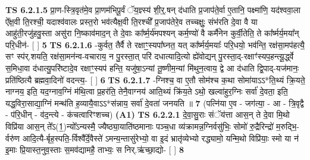 \documentclass[17pt]{extarticle}
\begin{document}
                  \newline
                                \textbf{ TS 6.2.1.5} \newline
                  प्रा॒ण-स्त्रि॒वृत॑मे॒व प्रा॒णम॑भिपू॒र्वं ॅय॒ज्ञ्स्य॑ शी॒र्॒.षन् द॑धाति प्र॒जाप॑ते॒र्वा ए॒तानि॒ पक्ष्मा॑णि॒ यद॑श्ववा॒ला ऐ᳚क्ष॒वी ति॒रश्ची॒ यदाश्व॑वालः प्रस्त॒रो भव॑त्यैक्ष॒वी ति॒रश्ची᳚ प्र॒जाप॑तेरे॒व तच्चक्षुः॒ संभ॑रति दे॒वा वै या आहु॑ती॒रजु॑हवु॒स्ता असु॑रा नि॒ष्काव॑माद॒न् ते दे॒वाः का᳚र्ष्म॒र्य॑मपश्यन् कर्म॒ण्यो॑ वै कर्मै॑नेन कुर्वी॒तेति॒ ते का᳚र्ष्मर्य॒मया᳚न् परि॒धीन॑- [  ] \textbf{  5} \newline
                  \newline
                                \textbf{ TS 6.2.1.6} \newline
                  -कुर्वत॒ तैर्वै ते रक्षाꣳ॒॒स्यपा᳚घ्नत॒ यत् का᳚र्ष्मर्य॒मयाः᳚ परि॒धयो॒ भव॑न्ति॒ रक्ष॑सा॒मप॑हत्यै॒ सꣳ स्प॑र्.शयति॒ रक्ष॑सा॒मन॑न्व-वचाराय॒ न पु॒रस्ता॒त् परि॑ दधात्यादि॒त्यो ह्ये॑वोद्यन् पु॒रस्ता॒द्-रक्षाꣳ॑स्यप॒हन्त्यू॒र्द्ध्वे स॒मिधा॒वा द॑धात्यु॒परि॑ष्टादे॒व रक्षाꣳ॒॒स्यप॑ हन्ति॒ यजु॑षा॒ऽन्यां तू॒ष्णीम॒न्यां मि॑थुन॒त्वाय॒ द्वे आ द॑धाति द्वि॒पाद्-यज॑मानः॒ प्रति॑ष्ठित्यै ब्रह्मवा॒दिनो॑ वदन्त्य॒- [  ] \textbf{  6} \newline
                  \newline
                                \textbf{ TS 6.2.1.7} \newline
                  -ग्निश्च॒ वा ए॒तौ सोम॑श्च क॒था सोमा॑याऽऽ*ति॒थ्यं क्रि॒यते॒ नाग्नय॒ इति॒ यद॒ग्नाव॒ग्निं म॑थि॒त्वा प्र॒हर॑ति॒ तेनै॒वाग्नय॑ आति॒थ्यं क्रि॑य॒ते ऽथो॒ खल्वा॑हुर॒ग्निः सर्वा॑ दे॒वता॒ इति॒ यद्ध॒विरा॒साद्या॒ग्निं मन्थ॑ति ह॒व्यायै॒वाऽऽ*स॑न्नाय॒ सर्वा॑ दे॒वता॑ जनयति ॥ \textbf{  7 } \newline
                  \newline
                      (पत्नि॑या ए॒व - जग॑त्या॒ - आ - त्रि॒वृद्वै - प॑रि॒धीन् - व॑द॒न्त्ये - क॑चत्वारिꣳशच्च)  \textbf{(A1)} \newline \newline
                                        \textbf{ TS 6.2.2.1} \newline
                  दे॒वा॒सु॒राः संॅय॑त्ता आस॒न् ते दे॒वा मि॒थो विप्रि॑या आस॒न् ते᳚ऽ(1॒)न्यो᳚ऽन्यस्मै॒ ज्यैष्ठ्या॒याति॑ष्ठमानाः पञ्च॒धा व्य॑क्रामन्न॒ग्निर्वसु॑भिः॒ सोमो॑ रु॒द्रैरिन्द्रो॑ म॒रुद्भि॒-र्वरु॑ण आदि॒त्यै-र्बृह॒स्पति॒-र्विश्वै᳚र्दे॒वैस्ते॑ ऽमन्य॒न्तासु॑रेभ्यो॒ वा इ॒दं भ्रातृ॑व्येभ्यो रद्ध्यामो॒ यन्मि॒थो विप्रि॑याः॒ स्मो या न॑ इ॒माः प्रि॒यास्त॒नुव॒स्ताः स॒मव॑द्यामहै॒ ताभ्यः॒ स निर्.ऋ॑च्छा॒द्यो- [  ] \textbf{  8} \newline
\end{document}

